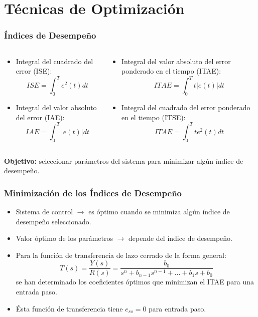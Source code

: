 \documentclass[aspectratio=169,handout]{beamer}
\theoremstyle{definition}
\theoremstyle{plain}
\theoremstyle{remark}
\begin{document}
\section{Técnicas de Optimización}
\begin{frame}[<+->]\frametitle{Índices de Desempeño}
	\begin{columns}
	\begin{column}{0.5\textwidth}
	\begin{itemize}
		\item Integral del cuadrado del error (ISE):
		\begin{equation*}
			ISE = \int_0^T e^2(t) dt
		\end{equation*}
		\item Integral del valor absoluto del error (IAE):
		\begin{equation*}
			IAE = \int_0^T |e(t)| dt
		\end{equation*}
	\end{itemize}
	\end{column}	
	\begin{column}{0.5\textwidth}
	\begin{itemize}
		\item Integral del valor absoluto del error ponderado en el tiempo (ITAE):
		\begin{equation*}
			ITAE = \int_0^T t |e(t)| dt
		\end{equation*}
		\item Integral del cuadrado del error ponderado en el tiempo (ITSE):
		\begin{equation*}
			ITAE = \int_0^T t e^2(t) dt
		\end{equation*}
	\end{itemize}
	\end{column}	
	\end{columns}
	\vspace*{-5mm}
	\textbf{Objetivo:} seleccionar parámetros del sistema para minimizar algún índice de desempeño.
\end{frame}
\begin{frame}[<+->]\frametitle{Minimización de los Índices de Desempeño}
\begin{itemize}
	\item Sistema de control $\rightarrow$ es óptimo cuando se minimiza algún índice de desempeño seleccionado.
	\item Valor óptimo de los parámetros $\rightarrow$ depende del índice de desempeño.
	\item Para la función de transferencia de lazo cerrado de la forma general:
	\begin{equation*}
		T(s) = \frac{Y(s)}{R(s)} = \frac{b_0}{s^n + b_{n-1} s^{n-1} + \dots + b_1 s + b_0}
	\end{equation*}
	se han determinado los coeficientes óptimos que minimizan el ITAE para una entrada paso.
	\item Ésta función de transferencia tiene $e_{ss} = 0$ para entrada paso.
\end{itemize}
\end{frame}
\end{document}
